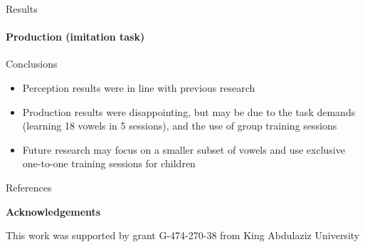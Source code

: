 \documentclass[final,xcolor={cmyk,hyperref}]{beamer}
\makeatletter
\def\tikzfigureref#1{\hskip0.125ex
\tikz[baseline=(@.base)]\node[figure label,
anchor=base, inner sep=0.333ex, font=\small\bfseries]{\csname tikzfigure@label@#1\endcsname};
}
\makeatother
\begin{document}
\begin{frame}[t]
\begin{columns}[t]
\begin{column}{0.525\linewidth}
\begin{block}{Results}

\paragraph{Production (imitation task)}

\def\op{\hskip0.2ex}
  \end{block}





\begin{block}{Conclusions}

\begin{itemize}
  \item Perception results were in line with previous research \cite{alshangiti_2015,hattori_2009}

  \item Production results were disappointing,
  but may be due to the task demands (learning 18 vowels in 5 sessions),
  and the use of group training sessions

  \item
  Future research may focus on a smaller subset of vowels
  and use exclusive one-to-one training sessions for children
\end{itemize}
\end{block}

\begin{block}{\small References}
  \renewcommand\bibfont{\tiny}
  \printbibliography
\end{block}

\vspace*{-0.125in}
\textbf{Acknowledgements}

  This work was supported by
  grant G-474-270-38 from King Abdulaziz University

\end{column}

\end{columns}

\end{frame}
\end{document}
